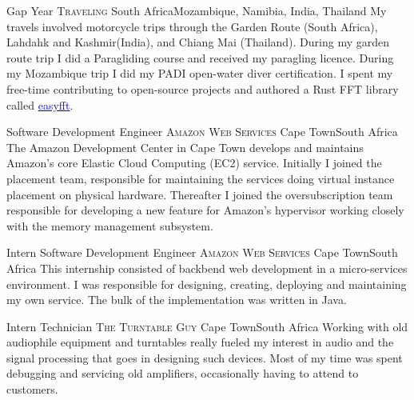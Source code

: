 \documentclass[10pt,a4paper,sans]{moderncv}
\begin{document}
\cventry{ 2022\newline }
{Gap Year}
{\textsc{Traveling}}
{\newline South Africa}{Mozambique, Namibia, India, Thailand}
{My travels involved motorcycle trips through the Garden Route (South Africa),
Lahdahk and Kashmir(India), and Chiang Mai (Thailand). During my garden route
trip I did a Paragliding course and received my paragling licence. During my
Mozambique trip I did my PADI open-water diver certification. I spent my
free-time contributing to open-source projects and authored a Rust FFT library
called
\href{https://docs.rs/easyfft/latest/easyfft/}{\textcolor{blue}{easyfft}}.}

{Software Development Engineer}
{\textsc{Amazon Web Services}}
{\newline Cape Town}{South Africa}
{The Amazon Development Center in Cape Town develops and maintains Amazon's
core Elastic Cloud Computing (EC2) service. Initially I joined the placement
team, responsible for maintaining the services doing virtual instance placement
on physical hardware. Thereafter I joined the oversubscription team responsible
for developing a new feature for Amazon's hypervisor working closely with the
memory management subsystem.}

{Intern Software Development Engineer}
{\textsc{Amazon Web Services}}
{\newline Cape Town}{South Africa}
{This internship consisted of backbend web development in a micro-services
environment. I was responsible for designing, creating, deploying and maintaining
my own service. The bulk of the implementation was written in Java.}

{Intern Technician}
{\textsc{The Turntable Guy}}
{\newline Cape Town}{South Africa}
{Working with old audiophile equipment and turntables really fueled my interest in
audio and the signal processing that goes in designing such devices. Most of my
time was spent debugging and servicing old amplifiers, occasionally having to
attend to customers.}
\end{document}
